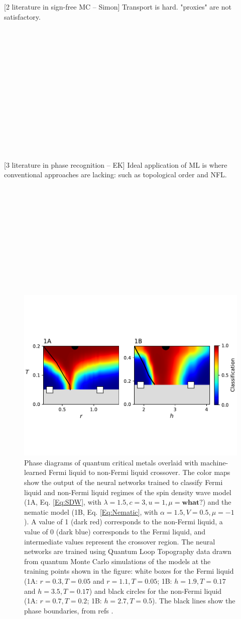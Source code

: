 \documentclass[amsmath,amssymb, aps, prx, longbibliography, twocolumn]{revtex4-1}
\begin{document}
[2 literature in sign-free MC -- Simon]
Transport is hard. "proxies" are not satisfactory.
\\
\\
\\
\\
\\
\\
\\
\\
\\
\\
\\
\\
\\
\\
\\

[3 literature in phase recognition -- EK]
Ideal application of ML is where conventional approaches are lacking: such as topological order and NFL.
 \\
 \\
 \\
 \\
 \\
 \\
 \\
 \\
 \\
 \\
 \\
 \\
 \begin{figure} [t]
    \centering
\includegraphics[width=.5\textwidth, trim={0 2.75cm 0 3cm}, clip]{3pt_pds.pdf}
    \caption{Phase diagrams of quantum critical metals overlaid with machine-learned Fermi liquid to non-Fermi liquid crossover. The color maps show the output of the neural networks trained to classify Fermi liquid and non-Fermi liquid regimes of the spin density wave model (1A, Eq. \ref{Eq:SDW}, with $\lambda =1.5,c=3,u=1,\mu=\textbf{what?}$) and the nematic model (1B, Eq. \ref{Eq:Nematic}, with $\alpha=1.5,V=0.5,\mu=-1$).
    A value of 1 (dark red) corresponds to the non-Fermi liquid, a value of 0 (dark blue) corresponds to the Fermi liquid, and intermediate values represent the crossover region. The neural networks are trained using Quantum Loop Topography data drawn from quantum Monte Carlo simulations of the models at the training points shown in the figure: white boxes for the Fermi liquid (1A: $r=0.3,T=0.05$ and $r=1.1,T=0.05$; 1B: $h=1.9,T=0.17$ and $h=3.5,T=0.17$) and black circles for the non-Fermi liquid (1A: $r=0.7,T=0.2$; 1B: $h=2.7,T=0.5$). The black lines show the phase boundaries, from refs \cite{Lederer4905,Gerlach2017}.}
    \label{fig:pds}
\end{figure}
\end{document}
